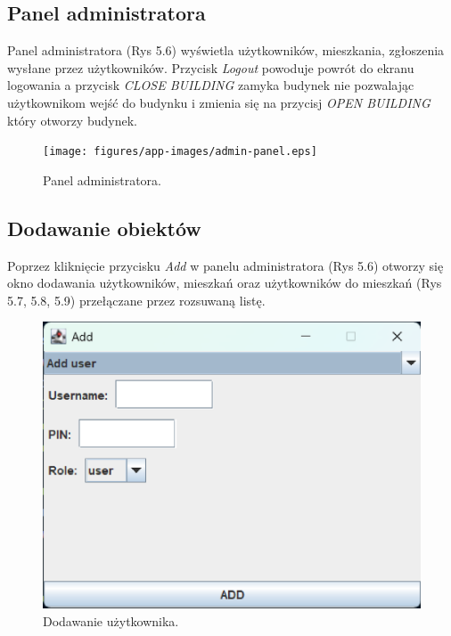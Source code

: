 \subsection{Panel administratora}
Panel administratora (Rys 5.6) wyświetla użytkowników, mieszkania, zgłoszenia wysłane przez użytkowników.
Przycisk \textit{Logout} powoduje powrót do ekranu logowania a przycisk \textit{CLOSE BUILDING} zamyka budynek nie pozwalając użytkownikom 
wejść do budynku i zmienia się na przycisj \textit{OPEN BUILDING} który otworzy budynek.
\begin{figure}[H]
    \centering
    \texttt{[image: figures/app-images/admin-panel.eps]}
    \caption{Panel administratora.\label{fig11}}
\end{figure}

\newpage
\subsection{Dodawanie obiektów}
Poprzez kliknięcie przycisku \textit{Add} w panelu administratora (Rys 5.6) otworzy się okno dodawania użytkowników, mieszkań 
oraz użytkowników do mieszkań (Rys 5.7, 5.8, 5.9) przełączane przez rozsuwaną listę.

\begin{figure}[H]
    \centering
    \includegraphics[width=\textwidth,height=0.2\textheight,keepaspectratio]{figures/app-images/Add/add-user.eps}
    \caption{Dodawanie użytkownika.\label{fig12}}
\end{figure}


